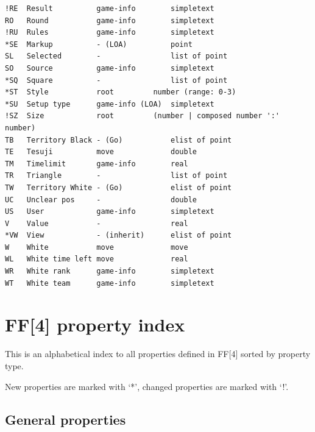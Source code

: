 \begin{verbatim}
!RE  Result          game-info        simpletext
RO   Round           game-info        simpletext
!RU  Rules           game-info        simpletext
*SE  Markup          - (LOA)          point
SL   Selected        -                list of point
SO   Source          game-info        simpletext
*SQ  Square          -                list of point
*ST  Style           root         number (range: 0-3)
*SU  Setup type      game-info (LOA)  simpletext
!SZ  Size            root         (number | composed number ':' number)
TB   Territory Black - (Go)           elist of point
TE   Tesuji          move             double
TM   Timelimit       game-info        real
TR   Triangle        -                list of point
TW   Territory White - (Go)           elist of point
UC   Unclear pos     -                double
US   User            game-info        simpletext
V    Value           -                real
*VW  View            - (inherit)      elist of point
W    White           move             move
WL   White time left move             real
WR   White rank      game-info        simpletext
WT   White team      game-info        simpletext
\end{verbatim}

\newpage

\section{FF{[}4{]} property index}\label{ff4-property-index-1}

This is an alphabetical index to all properties defined in FF{[}4{]}
sorted by property type.

New properties are marked with `*', changed properties are marked with
`!'.

\subsection{General properties}\label{general-properties}

